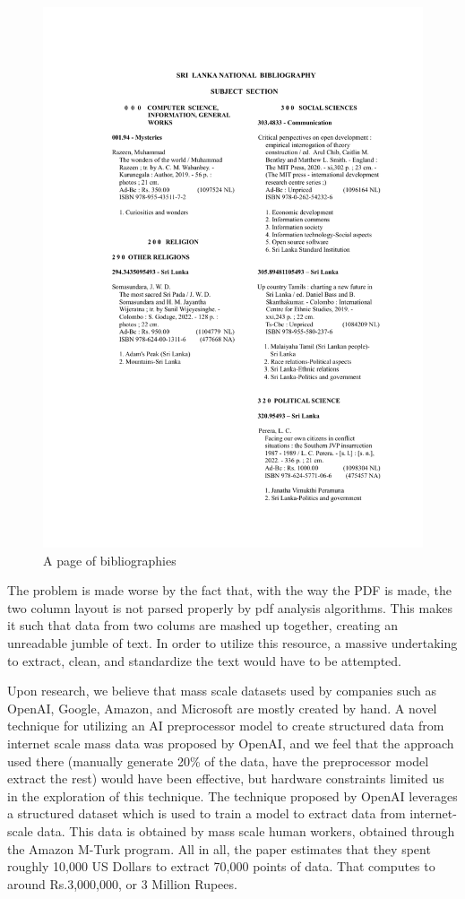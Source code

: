 \begin{figure}[htbp]
    \centering
    \includegraphics[width=1\textwidth]{../../assets/slnb_june_pg47.png}
    \caption{A page of bibliographies}
    \label{fig:slnbpage}
\end{figure}

The problem is made worse by the fact that, with the way the PDF is made, the two column layout is not parsed properly by pdf analysis algorithms. This makes it such that data from two colums are mashed up together, creating an unreadable jumble of text. In order to utilize this resource, a massive undertaking to extract, clean, and standardize the text would have to be attempted.

Upon research, we believe that mass scale datasets used by companies such as OpenAI, Google, Amazon, and Microsoft are mostly created by hand. A novel technique for utilizing an AI preprocessor model to create structured data from internet scale mass data was proposed by OpenAI, and we feel that the approach used there (manually generate 20\% of the data, have the preprocessor model extract the rest) would have been effective, but hardware constraints limited us in the exploration of this technique.
The technique proposed by OpenAI \cite{baker2022video} leverages a structured dataset which is used to train a model to extract data from internet-scale data. This data is obtained by mass scale human workers, obtained through the Amazon M-Turk program. All in all, the paper estimates that they spent roughly 10,000 US Dollars to extract 70,000 points of data. That computes to around Rs.3,000,000, or 3 Million Rupees.


